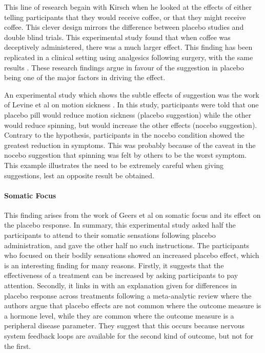 This line of research begain with Kirsch \cite{kirsch1988double} when he looked at the effects of either telling participants that they would receive coffee, or that they might receive coffee. This clever design  mirrors the difference between placebo studies and double blind trials. This experimental study found that when coffee was deceptively administered, there was a much larger effect. This finding has been replicated in a clinical setting using analgesics following surgery, with the same results \cite{Amanzio2001}.  These research findings argue in favour of the suggestion in placebo being one of the major factors in driving the effect. 

An experimental study which shows the subtle effects of suggestion was the work of Levine et al  on motion sickness \cite{Levine2006}.  In this study, participants were told that one placebo pill would reduce motion sickness (placebo suggestion) while the other would reduce spinning, but would increase the other effects (nocebo suggestion). Contrary to the hypothesis, participants in the nocebo condition showed the greatest reduction in symptoms. This was probably because of the caveat in the nocebo suggestion that spinning was felt by others to be the worst symptom. This example illustrates the need to be extremely careful when giving suggestions, lest an opposite result be obtained. 

\paragraph{Somatic Focus}

This finding arises from the work of Geers et al \cite{Geers2006}  on somatic focus and its effect on the placebo response. In summary, this experimental study asked half the participants to attend to their somatic sensations following placebo administration, and gave the other half no such instructions. The participants who focused on their bodily sensations showed an increased placebo effect, which is an interesting finding for many reasons. Firstly, it suggests that the effectiveness of a treatment can be increased by asking participants to pay attention. Secondly, it links in with an explanation given for differences in placebo response across treatments following a meta-analytic review \cite{Meissner2007} where the authors argue that placebo effects are not common where the outcome measure is a hormone level, while they are common where the outcome measure is a peripheral disease parameter. They suggest that this occurs because nervous system feedback loops are available for the second kind of outcome, but not for the first. 


